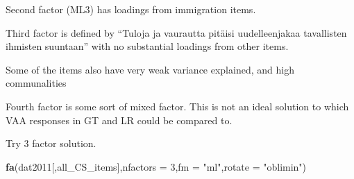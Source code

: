 \documentclass[
]{article}
\newenvironment{Shaded}{\begin{snugshade}}{\end{snugshade}}
\newcommand{\DataTypeTok}[1]{\textcolor[rgb]{0.13,0.29,0.53}{#1}}
\newcommand{\DecValTok}[1]{\textcolor[rgb]{0.00,0.00,0.81}{#1}}
\newcommand{\KeywordTok}[1]{\textcolor[rgb]{0.13,0.29,0.53}{\textbf{#1}}}
\newcommand{\NormalTok}[1]{#1}
\newcommand{\StringTok}[1]{\textcolor[rgb]{0.31,0.60,0.02}{#1}}
\begin{document}
Second factor (ML3) has loadings from immigration items.

Third factor is defined by ``Tuloja ja vaurautta pitäisi uudelleenjakaa
tavallisten ihmisten suuntaan'' with no substantial loadings from other
items.

Some of the items also have very weak variance explained, and high
communalities

Fourth factor is some sort of mixed factor. This is not an ideal
solution to which VAA responses in GT and LR could be compared to.

Try 3 factor solution.

\begin{Shaded}
\begin{Highlighting}[]
\KeywordTok{fa}\NormalTok{(dat2011[,all_CS_items],}\DataTypeTok{nfactors =} \DecValTok{3}\NormalTok{,}\DataTypeTok{fm =} \StringTok{"ml"}\NormalTok{,}\DataTypeTok{rotate =} \StringTok{"oblimin"}\NormalTok{)}
\end{Highlighting}
\end{Shaded}
\end{document}

